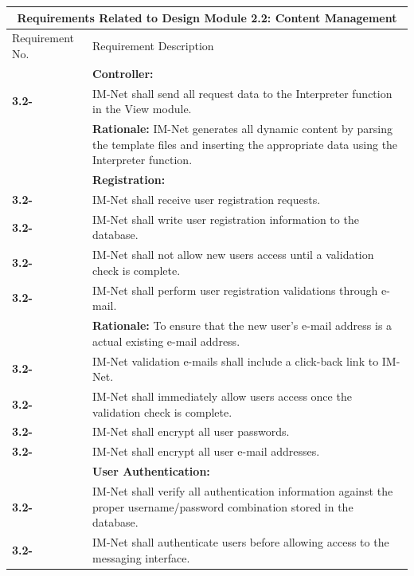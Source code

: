 \documentclass[letterpaper,12pt]{article}
\newcounter{rcounter}							%
\newcommand\rnumber{\stepcounter{rcounter}\arabic{rcounter}}
\begin{document}
{\begin{center}
\begin{tabular}{|l|p{6in}|}
\end{tabular} 
\end{center}

\setcounter{rcounter}{0}
\begin{center}
\begin{tabular}{|l|p{6in}|}
\hline 
\multicolumn{2}{|c|}{\textbf{Requirements Related to Design Module 2.2: Content Management}} \\ 
\hline 
Requirement No. & Requirement Description \\ 
\hline
& \textbf{Controller:} \\
\hline
\textbf{3.2-\rnumber} & IM-Net shall send all request data to the Interpreter function in the View module. \\
& \textbf{Rationale:} IM-Net generates all dynamic content by parsing the template files and inserting the appropriate data using the Interpreter function. \\
\hline 
& \textbf{Registration:} \\
\hline
\textbf{3.2-\rnumber} & IM-Net shall receive user registration requests. \\
\hline 
\textbf{3.2-\rnumber} & IM-Net shall write user registration information to the database. \\ 
\hline 
\textbf{3.2-\rnumber} & IM-Net shall not allow new users access until a validation check is complete. \\ 
\hline 
\textbf{3.2-\rnumber} & IM-Net shall perform user registration validations through e-mail. \\
& \textbf{Rationale:} To ensure that the new user's e-mail address is a actual existing e-mail address.\\
\hline 
\textbf{3.2-\rnumber} & IM-Net validation e-mails shall include a click-back link to IM-Net. \\ 
\hline 
\textbf{3.2-\rnumber} & IM-Net shall immediately allow users access once the validation check is complete. \\ 
\hline 
\textbf{3.2-\rnumber} & IM-Net shall encrypt all user passwords. \\ 
\hline 
\textbf{3.2-\rnumber} & IM-Net shall encrypt all user e-mail addresses. \\ 
\hline 
& \textbf{User Authentication:} \\
\hline
\textbf{3.2-\rnumber} & IM-Net shall verify all authentication information against the proper username/password combination stored in the database. \\ 
\hline 
\textbf{3.2-\rnumber} & IM-Net shall authenticate users before allowing access to the messaging interface. \\ 

\end{tabular}
\end{center}}
\end{document}
